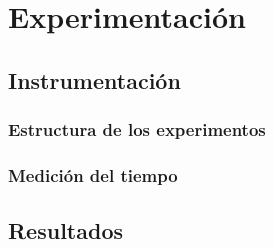 \chapter{Experimentación}
\section{Instrumentación}
\subsection{Estructura de los experimentos}
\subsection{Medición del tiempo}

\section{Resultados}
